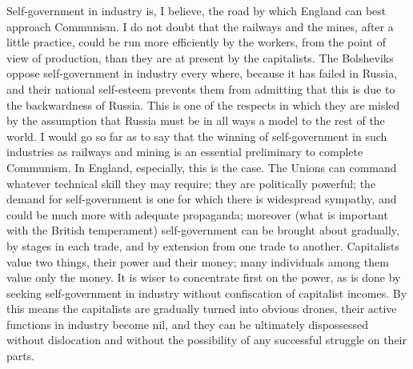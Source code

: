 Self-government in industry is, I believe, the road by which England can best approach Communism. I do not doubt that the railways and the mines, after a little practice, could be run more efficiently by the workers, from the point of view of production, than they are at present by the capitalists. The Bolsheviks oppose self-government in industry every where, because it has failed in Russia, and their national self-esteem prevents them from admitting that this is due to the backwardness of Russia. This is one of the respects in which they are misled by the assumption that Russia must be in all ways a model to the rest of the world. I would go so far as to say that the winning of self-government in such industries as railways and mining is an essential preliminary to complete Communism. In England, especially, this is the case. The Unions can command whatever technical skill they may require; they are politically powerful; the demand for self-government is one for which there is widespread sympathy, and could be much more with adequate propaganda; moreover (what is important with the British temperament) self-government can be brought about gradually, by stages in each trade, and by extension from one trade to another. Capitalists value two things, their power and their money; many individuals among them value only the money. It is wiser to concentrate first on the power, as is done by seeking self-government in industry without confiscation of capitalist incomes. By this means the capitalists are gradually turned into obvious drones, their active functions in industry become nil, and they can be ultimately dispossessed without dislocation and without the possibility of any successful struggle on their parts.

